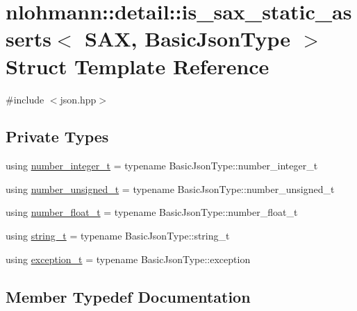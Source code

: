 \hypertarget{structnlohmann_1_1detail_1_1is__sax__static__asserts}{}\section{nlohmann\+::detail\+::is\+\_\+sax\+\_\+static\+\_\+asserts$<$ S\+AX, Basic\+Json\+Type $>$ Struct Template Reference}
\label{structnlohmann_1_1detail_1_1is__sax__static__asserts}


{\ttfamily \#include $<$json.\+hpp$>$}

\subsection*{Private Types}
\begin{DoxyCompactItemize}
\item 
using \mbox{\hyperlink{structnlohmann_1_1detail_1_1is__sax__static__asserts_a474adf99bf1eaa8292284fd3064c80fe}{number\+\_\+integer\+\_\+t}} = typename Basic\+Json\+Type\+::number\+\_\+integer\+\_\+t
\item 
using \mbox{\hyperlink{structnlohmann_1_1detail_1_1is__sax__static__asserts_af8733df7fcaebb25434285885db7f127}{number\+\_\+unsigned\+\_\+t}} = typename Basic\+Json\+Type\+::number\+\_\+unsigned\+\_\+t
\item 
using \mbox{\hyperlink{structnlohmann_1_1detail_1_1is__sax__static__asserts_a65d4be40c41ddc31fd2c3583d87d5faf}{number\+\_\+float\+\_\+t}} = typename Basic\+Json\+Type\+::number\+\_\+float\+\_\+t
\item 
using \mbox{\hyperlink{structnlohmann_1_1detail_1_1is__sax__static__asserts_a067c98d2145bb54d862f4794ac1287bb}{string\+\_\+t}} = typename Basic\+Json\+Type\+::string\+\_\+t
\item 
using \mbox{\hyperlink{structnlohmann_1_1detail_1_1is__sax__static__asserts_a34e1bc8ab7adbbab5f7d8c45a964020b}{exception\+\_\+t}} = typename Basic\+Json\+Type\+::exception
\end{DoxyCompactItemize}


\subsection{Member Typedef Documentation}
\mbox{\label{structnlohmann_1_1detail_1_1is__sax__static__asserts_a34e1bc8ab7adbbab5f7d8c45a964020b}} 
